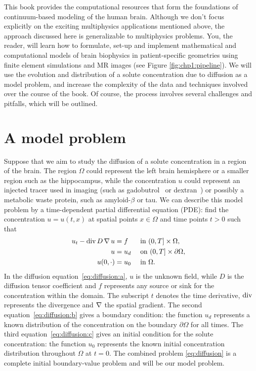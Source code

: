 This book provides the computational resources that form the
foundations of continuum-based modeling of the human brain. Although
we don't focus explicitly on the exciting multiphysics applications
mentioned above, the approach discussed here is generalizable to
multiphysics problems. You, the reader, will learn how to formulate,
set-up and implement mathematical and computational models of brain
biophysics in patient-specific geometries using finite element
simulations and MR images (see Figure \ref{fig:chp1:pipeline}). We
will use the evolution and distribution of a solute concentration due
to diffusion as a model problem, and increase the complexity of the
data and techniques involved over the course of the book. Of course,
the process involves several challenges and pitfalls, which will be
outlined.

\section{A model problem}

 Suppose that we aim to study the diffusion
of a solute concentration in a region of the brain. The region
$\Omega$ could represent the left brain hemisphere or a smaller region
such as the hippocampus, while the concentration $u$ could represent
an injected tracer used in imaging (such as
gadobutrol~\cite{ringstad2018brain} or
dextran~\cite{iliff2013cerebral}) or possibly a metabolic waste
protein, such as amyloid-$\beta$ or tau. We can describe this model
problem by a time-dependent partial differential equation (PDE): find
the concentration $u = u(t, x)$ at spatial points $x \in \Omega$ and
time points $t > 0$ such that
\begin{subequations}
  \label{eq:diffusion}
  \begin{align}
    \label{eq:diffusion:a}
    u_t - \operatorname{\mathrm{div}} D \operatorname{\nabla} u &= f &&\text{ in } (0, T] \times \Omega, \\
    \label{eq:diffusion:b}
    u &= u_d && \text{ on } (0, T] \times \partial \Omega, \\
    \label{eq:diffusion:c}
    u(0, \cdot) &= u_0 && \text{ in } \Omega.
  \end{align}
\end{subequations}
In the diffusion equation~\eqref{eq:diffusion:a}, $u$ is the unknown
field, while $D$ is the diffusion tensor coefficient and $f$
represents any source or sink for the concentration within the
domain. The subscript $t$ denotes the time derivative, $\operatorname{\mathrm{div}}$
represents the divergence and $\operatorname{\nabla}$ the spatial gradient. The second
equation~\eqref{eq:diffusion:b} gives a boundary condition: the
function $u_d$ represents a known distribution of the concentration on
the boundary $\partial \Omega$ for all times. The third
equation~\eqref{eq:diffusion:c} gives an initial condition for the
solute concentration: the function $u_0$ represents the known initial
concentration distribution throughout $\Omega$ at $t=0$. The combined
problem \eqref{eq:diffusion} is a complete initial boundary-value
problem and will be our model problem.


